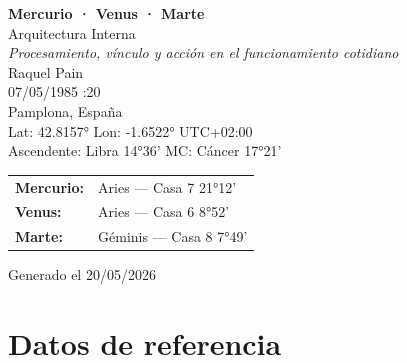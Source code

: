 \documentclass[11pt,a4paper]{article}
\begin{document}

\begin{titlepage}
  \centering

  \vspace*{2cm}

  {\Huge\bfseries\color{azulai} Mercurio · Venus · Marte}\\[0.6cm]

  {\large\color{grisai} Arquitectura Interna}\\[0.4cm]

  {\small\itshape\color{grisai}
  Procesamiento, vínculo y acción en el funcionamiento cotidiano
  }\\[2.2cm]

  {\huge\color{doradoai} Raquel Pain}\\[1.6cm]

  {\Large 07/05/1985 :20}\\[0.35cm]

  {\Large Pamplona, España}\\[0.35cm]

  {\normalsize
  Lat: 42.8157° \quad
  Lon: -1.6522° \quad
  UTC+02:00
  }\\[0.35cm]

  {\normalsize
  Ascendente: Libra 14°36'
  \quad
  MC: Cáncer 17°21'
  }\\[2.2cm]

  \renewcommand{\arraystretch}{1.35}

  \begin{tabular}{ll}
    \textbf{Mercurio:} & Aries — Casa 7 21°12' \\
    \textbf{Venus:}    & Aries — Casa 6 8°52' \\
    \textbf{Marte:}    & Géminis — Casa 8 7°49' \\
  \end{tabular}

  \vfill

  {\small\color{grisai}
  Generado el 20/05/2026
  }

\end{titlepage}

\justifying

\tableofcontents

\clearpage

\section{Datos de referencia}
\end{document}
